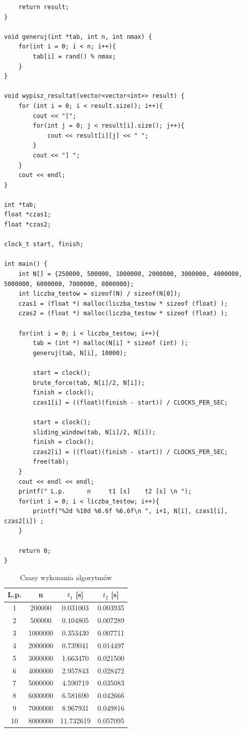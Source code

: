 \documentclass{article}
\begin{document}
\begin{lstlisting}
    return result;
}

void generuj(int *tab, int n, int nmax) {
    for(int i = 0; i < n; i++){
        tab[i] = rand() % nmax;
    }
}

void wypisz_resultat(vector<vector<int>> result) {
    for (int i = 0; i < result.size(); i++){
        cout << "[";
        for(int j = 0; j < result[i].size(); j++){
            cout << result[i][j] << " ";
        }
        cout << "] ";
    }
    cout << endl;
}

int *tab;
float *czas1;
float *czas2;

clock_t start, finish;

int main() {
    int N[] = {250000, 500000, 1000000, 2000000, 3000000, 4000000, 5000000, 6000000, 7000000, 8000000};
    int liczba_testow = sizeof(N) / sizeof(N[0]);
    czas1 = (float *) malloc(liczba_testow * sizeof (float) );
    czas2 = (float *) malloc(liczba_testow * sizeof (float) );

    for(int i = 0; i < liczba_testow; i++){
        tab = (int *) malloc(N[i] * sizeof (int) );
        generuj(tab, N[i], 10000);

        start = clock();
        brute_force(tab, N[i]/2, N[i]);
        finish = clock();
        czas1[i] = ((float)(finish - start)) / CLOCKS_PER_SEC;

        start = clock();
        sliding_window(tab, N[i]/2, N[i]);
        finish = clock();
        czas2[i] = ((float)(finish - start)) / CLOCKS_PER_SEC;
        free(tab);
    }
    cout << endl << endl;
    printf(" L.p.      n     t1 [s]    t2 [s] \n ");
    for(int i = 0; i < liczba_testow; i++){
        printf("%2d %10d %6.6f %6.6f\n ", i+1, N[i], czas1[i], czas2[i]) ;
    }

    return 0;
}

\end{lstlisting}

\begin{table}[h!]
\centering
\label{tab:czasy}
\begin{tabular}{|c|c|c|c|}
\hline
\textbf{L.p.} & \textbf{n} & \textbf{$t_1$ [s]} & \textbf{$t_2$ [s]} \\
\hline
1  & 200000  & 0.031003  & 0.003935 \\
2  & 500000  & 0.104805  & 0.007289 \\
3  & 1000000 & 0.353430  & 0.007711 \\
4  & 2000000 & 0.739041  & 0.014497 \\
5  & 3000000 & 1.663470  & 0.021500 \\
6  & 4000000 & 2.957843  & 0.028472 \\
7  & 5000000 & 4.590719  & 0.035083 \\
8  & 6000000 & 6.581690  & 0.042666 \\
9  & 7000000 & 8.967931  & 0.049816 \\
10 & 8000000 & 11.732619 & 0.057095 \\
\hline
\end{tabular}
\caption{Czasy wykonania algorytmów}
\end{table}
\end{document}
